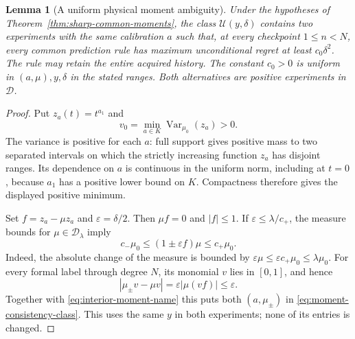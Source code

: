 \documentclass[11pt]{amsart}
\newtheorem{lemma}[theorem]{Lemma}
\theoremstyle{definition}\newtheorem{definition}[theorem]{Definition}
\theoremstyle{remark}\newtheorem{remark}[theorem]{Remark}
\begin{document}
\begin{lemma}[A uniform physical moment ambiguity]
\label{lem:uniform-collision-ambiguity}
Under the hypotheses of Theorem~\ref{thm:sharp-common-moments}, the
class $\mathcal U(y,\delta)$ contains two experiments with the same
calibration $a$ such that, at every checkpoint $1\le n<N$, every
common prediction rule has maximum unconditional regret at least
$c_0\delta^2$. The rule may retain the entire acquired history.
The constant $c_0>0$ is uniform in $(a,\mu),y,\delta$ in the stated
ranges. Both alternatives are positive experiments in $\mathcal D$.
\end{lemma}
\begin{proof}
Put $z_a(t)=t^{a_1}$ and
\[
 v_0=\min_{a\in K}\operatorname{Var}_{\mu_0}(z_a)>0.
\]
The variance is positive for each $a$: full support gives positive mass
to two separated intervals on which the strictly increasing function
$z_a$ has disjoint ranges. Its dependence on $a$ is continuous in the
uniform norm, including at $t=0$, because $a_1$ has a positive lower
bound on $K$. Compactness therefore gives the displayed positive minimum.

Set $f=z_a-\mu z_a$ and $\varepsilon=\delta/2$. Then $\mu f=0$
and $|f|\le1$. If $\varepsilon\le\lambda/c_+$, the measure bounds
for $\mu\in\mathcal D_\lambda$ imply
\[
 c_-\mu_0\le(1\pm\varepsilon f)\mu\le c_+\mu_0.
\]
Indeed, the absolute change of the measure is bounded by
$\varepsilon\mu\le\varepsilon c_+\mu_0\le\lambda\mu_0$.
For every formal label through degree $N$, its monomial $v$ lies in
$[0,1]$, and hence
\[
 |\mu_\pm v-\mu v|=\varepsilon|\mu(vf)|\le\varepsilon.
\]
Together with \eqref{eq:interior-moment-name} this puts both
$(a,\mu_\pm)$ in \eqref{eq:moment-consistency-class}. This uses the
same $y$ in both experiments; none of its entries is changed.


\end{proof}
\end{document}

